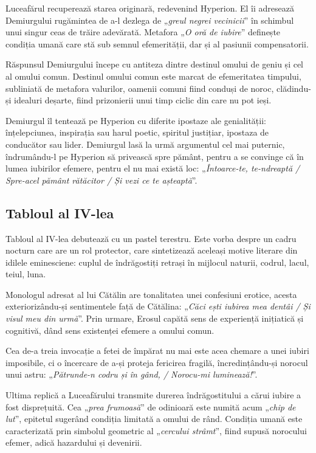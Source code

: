 \documentclass{article}
\newcommand{\qu}[1]{„\emph{#1}”}
\begin{document}
Luceafărul recuperează starea originară, redevenind Hyperion. El îi adresează Demiurgului rugămintea de a-l dezlega de \qu{greul negrei vecinicii} în schimbul unui singur ceas de trăire adevărată. Metafora \qu{O oră de iubire} definește condiția umană care stă sub semnul efemerității, dar și al pasiunii compensatorii.

Răspunsul Demiurgului începe cu antiteza dintre destinul omului de geniu și cel al omului comun. Destinul omului comun este marcat de efemeritatea timpului, subliniată de metafora valurilor, oamenii comuni fiind conduși de noroc, clădindu-și idealuri deșarte, fiind prizonierii unui timp ciclic din care nu pot ieși.

Demiurgul îl tentează pe Hyperion cu diferite ipostaze ale genialității: înțelepciunea, inspirația sau harul poetic, spiritul justițiar, ipostaza de conducător sau lider. Demiurgul lasă la urmă argumentul cel mai puternic, îndrumându-l pe Hyperion să privească spre pământ, pentru a se convinge că în lumea iubirilor efemere, pentru el nu mai există loc: \qu{Întoarce-te, te-ndreaptă / Spre-acel pământ rătăcitor / Și vezi ce te așteaptă}.

\subsection{Tabloul al IV-lea}
Tabloul al IV-lea debutează cu un pastel terestru. Este vorba despre un cadru nocturn care are un rol protector, care sintetizează aceleași motive literare din idilele eminesciene: cuplul de îndrăgostiți retrași în mijlocul naturii, codrul, lacul, teiul, luna.

Monologul adresat al lui Cătălin are tonalitatea unei confesiuni erotice, acesta exteriorizându-și sentimentele față de Cătălina: \qu{Căci ești iubirea mea dentâi / Și visul meu din urmă}. Prin urmare, Erosul capătă sens de experiență inițiatică și cognitivă, dând sens existenței efemere a omului comun.

Cea de-a treia invocație a fetei de împărat nu mai este acea chemare a unei iubiri imposibile, ci o încercare de a-și proteja fericirea fragilă, încredințându-și norocul unui astru: \qu{Pătrunde-n codru și în gând, / Norocu-mi luminează!}.

Ultima replică a Luceafărului transmite durerea îndrăgostitului a cărui iubire a fost disprețuită. Cea \qu{prea frumoasă} de odinioară este numită acum \qu{chip de lut}, epitetul sugerând condiția limitată a omului de rând. Condiția umană este caracterizată prin simbolul geometric al \qu{cercului strâmt}, fiind supusă norocului efemer, adică hazardului și devenirii.
\end{document}

